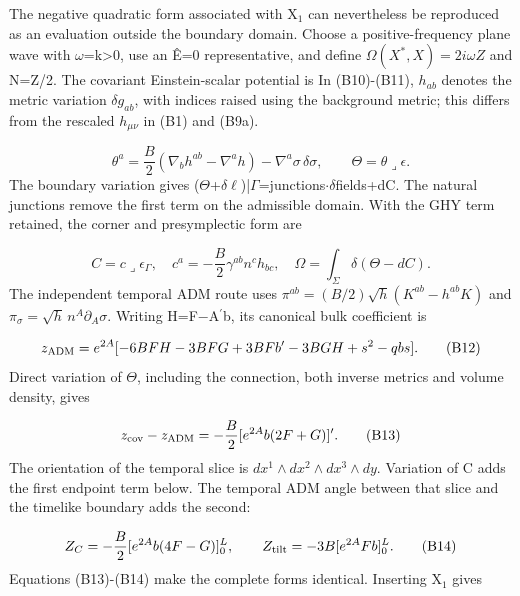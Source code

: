 \documentclass[11pt,a4paper]{article}
\begin{document}
The negative quadratic form associated with X\ensuremath{{}_{1}} can nevertheless be reproduced as an evaluation outside the boundary domain. Choose a positive-frequency plane wave with \ensuremath{\omega}=k>0, use an Ê=0 representative, and define \ensuremath{\Omega(X^*,X)=2i\omega Z} and N=Z/2. The covariant Einstein-scalar potential is In (B10)-(B11), \ensuremath{h_{ab}} denotes the metric variation \ensuremath{\delta g_{ab}}, with indices raised using the background metric; this differs from the rescaled \ensuremath{h_{\mu\nu}} in (B1) and (B9a).

\begin{equation}
\theta^a=\frac B2(\nabla_bh^{ab}-\nabla^ah)-\nabla^a\sigma\,\delta\sigma,\qquad\Theta=\theta\mathbin{\lrcorner}\epsilon.\tag{B10}
\end{equation}
The boundary variation gives (\ensuremath{\Theta}+\ensuremath{\delta}\ensuremath{\ell})|\ensuremath{\Gamma}=junctions\ensuremath{\cdot}\ensuremath{\delta}fields+dC. The natural junctions remove the first term on the admissible domain. With the GHY term retained, the corner and presymplectic form are \cite{ref21}

\begin{equation}
C=c\mathbin{\lrcorner}\epsilon_\Gamma,\quad c^a=-\frac B2\gamma^{ab}n^ch_{bc},\quad\Omega=\int_\Sigma\delta(\Theta-dC).\tag{B11}
\end{equation}
The independent temporal ADM route uses \ensuremath{\pi^{ab}=(B/2)\sqrt{h}(K^{ab}-h^{ab}K)} and \ensuremath{\pi_\sigma=\sqrt{h}\,n^A\partial_A\sigma}. Writing H=F\ensuremath{-}A\ensuremath{{}^{\prime}}b, its canonical bulk coefficient is

\begin{equation}
z_{\rm ADM}=e^{2A}[-6BFH-3BFG+3BFb'-3BGH+s^2-qbs].\tag{B12}
\end{equation}
Direct variation of \ensuremath{\Theta}, including the connection, both inverse metrics and volume density, gives

\begin{equation}
z_{\rm cov}-z_{\rm ADM}=-\frac B2[e^{2A}b(2F+G)]'.\tag{B13}
\end{equation}
The orientation of the temporal slice is \ensuremath{dx^1\wedge dx^2\wedge dx^3\wedge dy}. Variation of C adds the first endpoint term below. The temporal ADM angle between that slice and the timelike boundary adds the second:

\begin{equation}
Z_C=-\frac B2[e^{2A}b(4F-G)]_0^L,\qquad Z_{\rm tilt}=-3B[e^{2A}Fb]_0^L.\tag{B14}
\end{equation}
Equations (B13)-(B14) make the complete forms identical. Inserting X\ensuremath{{}_{1}} gives
\end{document}
